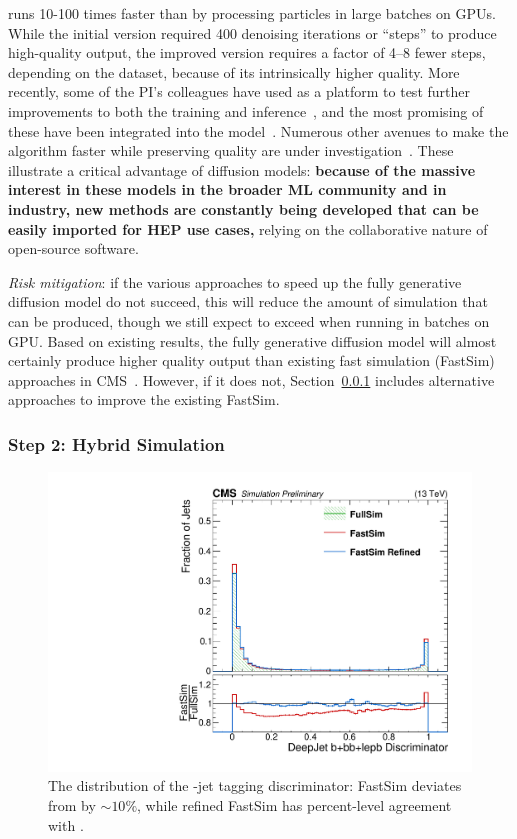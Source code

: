 \diffu runs 10-100 times faster than \GEANTfour by processing particles in large batches on GPUs.
While the initial version required 400 denoising iterations or ``steps'' to produce high-quality output,
the improved version requires a factor of 4--8 fewer steps, depending on the dataset, because of its intrinsically higher quality.
More recently, some of the PI's colleagues have used \diffu as a platform to test further improvements to both the training and inference~\cite{Jiang:2024ohg},
and the most promising of these have been integrated into the model~\cite{Amram:GitHub}.
Numerous other avenues to make the algorithm faster while preserving quality are under investigation~\cite{Rombach:2022,Song:2023,Mei:2023}.
These illustrate a critical advantage of diffusion models:
\textbf{because of the massive interest in these models in the broader ML community and in industry,
new methods are constantly being developed that can be easily imported for HEP use cases,}
relying on the collaborative nature of open-source software.

\textit{Risk mitigation}: if the various approaches to speed up the fully generative diffusion model do not succeed,
this will reduce the amount of simulation that can be produced,
though we still expect to exceed \GEANTfour when running in batches on GPU.
Based on existing results, the fully generative diffusion model will almost certainly produce higher quality output than existing fast simulation (FastSim) approaches in CMS~\cite{Sekmen:2016iql}.
However, if it does not, Section~\ref{subsec:refine} includes alternative approaches to improve the existing FastSim.

\subsubsection{Step 2: Hybrid Simulation}\label{subsec:refine}

\begin{figure}
\centering
\includegraphics[width=0.49\myfigurewidth]{figures/Regression_20221127_DeepFlavB_preliminary.pdf}
\caption{The distribution of the \DEEPJET \cPqb-jet tagging discriminator: FastSim deviates from \GEANTfour by ${\sim}10\%$, while refined FastSim has percent-level agreement with \GEANTfour.}
\label{fig:refine}
\end{figure}


